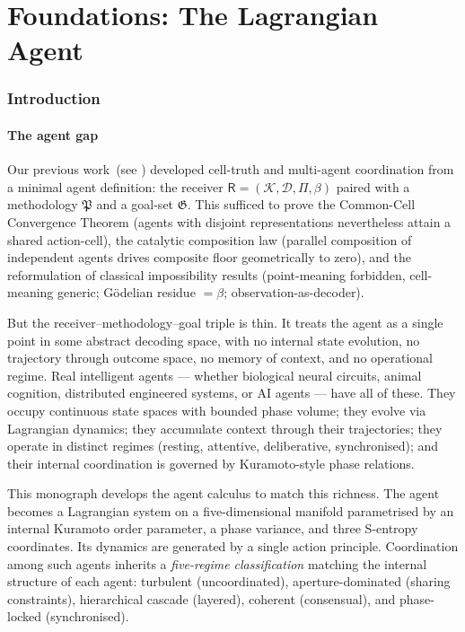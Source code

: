 \documentclass[11pt,twocolumn,a4paper]{article}
\newcommand{\K}{\mathcal{K}}
\newcommand{\D}{\mathcal{D}}
\newcommand{\Method}{\mathfrak{P}}
\newcommand{\Goal}{\mathfrak{G}}
\newcommand{\receiver}{\mathsf{R}}
\begin{document}
\tableofcontents
\clearpage

\part{Foundations: The Lagrangian Agent}

\section{Introduction}
\label{sec:intro}

\subsection{The agent gap}

Our previous work~(see ) developed cell-truth and
multi-agent coordination from a minimal agent definition: the receiver
$\receiver=(\K,\D,\Pi,\beta)$ paired with a methodology $\Method$ and a
goal-set $\Goal$. This sufficed to prove the
Common-Cell Convergence Theorem (agents with disjoint representations
nevertheless attain a shared action-cell), the catalytic composition
law (parallel composition of independent agents drives composite floor
geometrically to zero), and the reformulation of classical
impossibility results (point-meaning forbidden, cell-meaning generic;
Gödelian residue $=\beta$; observation-as-decoder).

But the receiver--methodology--goal triple is thin. It treats the agent
as a single point in some abstract decoding space, with no internal
state evolution, no trajectory through outcome space, no memory of
context, and no operational regime. Real intelligent agents --- whether
biological neural circuits, animal cognition, distributed engineered
systems, or AI agents --- have all of these. They occupy continuous
state spaces with bounded phase volume; they evolve via Lagrangian
dynamics; they accumulate context through their trajectories; they
operate in distinct regimes (resting, attentive, deliberative,
synchronised); and their internal coordination is governed by Kuramoto-style
phase relations.

This monograph develops the agent calculus to match this richness. The
agent becomes a Lagrangian system on a five-dimensional manifold
parametrised by an internal Kuramoto order parameter, a phase variance,
and three S-entropy coordinates. Its dynamics are generated by a single
action principle. Coordination among such agents inherits a
\emph{five-regime classification} matching the internal structure of
each agent: turbulent (uncoordinated), aperture-dominated (sharing
constraints), hierarchical cascade (layered), coherent (consensual),
and phase-locked (synchronised).
\end{document}
